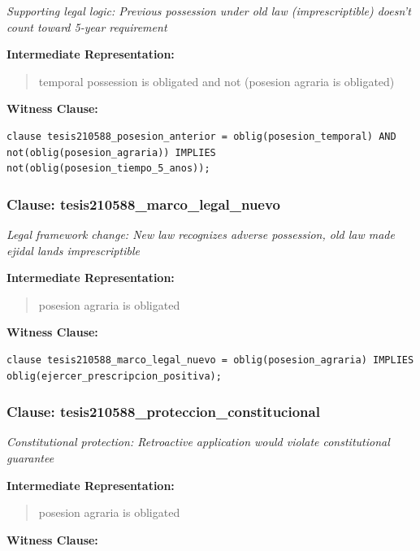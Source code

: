 \documentclass[11pt,a4paper]{article}
\begin{document}
\textit{Supporting legal logic: Previous possession under old law (imprescriptible) doesn't count toward 5-year requirement}

\textbf{Intermediate Representation:}

\begin{quote}
temporal possession is obligated and not (posesion agraria is obligated)
\end{quote}

\textbf{Witness Clause:}

\begin{lstlisting}[style=witnessstyle, language=Witness]
clause tesis210588_posesion_anterior = oblig(posesion_temporal) AND not(oblig(posesion_agraria)) IMPLIES not(oblig(posesion_tiempo_5_anos));
\end{lstlisting}

\subsubsection{Clause: tesis210588\_marco\_legal\_nuevo}

\textit{Legal framework change: New law recognizes adverse possession, old law made ejidal lands imprescriptible}

\textbf{Intermediate Representation:}

\begin{quote}
posesion agraria is obligated
\end{quote}

\textbf{Witness Clause:}

\begin{lstlisting}[style=witnessstyle, language=Witness]
clause tesis210588_marco_legal_nuevo = oblig(posesion_agraria) IMPLIES oblig(ejercer_prescripcion_positiva);
\end{lstlisting}

\subsubsection{Clause: tesis210588\_proteccion\_constitucional}

\textit{Constitutional protection: Retroactive application would violate constitutional guarantee}

\textbf{Intermediate Representation:}

\begin{quote}
posesion agraria is obligated
\end{quote}

\textbf{Witness Clause:}
\end{document}
